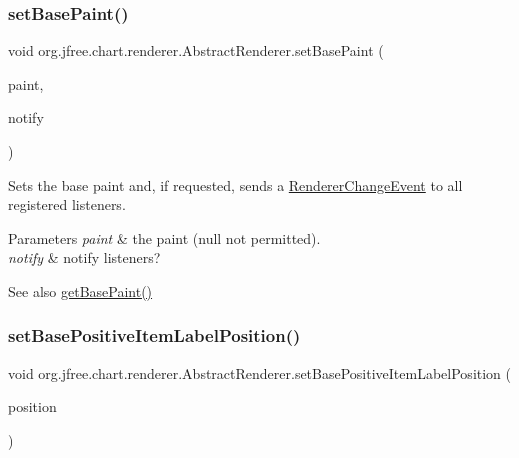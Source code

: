 \subsubsection{\texorpdfstring{set\+Base\+Paint()}{setBasePaint()}\hspace{0.1cm}{\footnotesize\ttfamily [2/2]}}
{\footnotesize\ttfamily void org.\+jfree.\+chart.\+renderer.\+Abstract\+Renderer.\+set\+Base\+Paint (\begin{DoxyParamCaption}\item[{Paint}]{paint,  }\item[{boolean}]{notify }\end{DoxyParamCaption})}

Sets the base paint and, if requested, sends a \mbox{\hyperlink{}{Renderer\+Change\+Event}} to all registered listeners.


\begin{DoxyParams}{Parameters}
{\em paint} & the paint ({\ttfamily null} not permitted). \\
\hline
{\em notify} & notify listeners?\\
\hline
\end{DoxyParams}
\begin{DoxySeeAlso}{See also}
\mbox{\hyperlink{classorg_1_1jfree_1_1chart_1_1renderer_1_1_abstract_renderer_a856d21345f9547c9ea9666db2c4928a2}{get\+Base\+Paint()}} 
\end{DoxySeeAlso}
\mbox{\label{classorg_1_1jfree_1_1chart_1_1renderer_1_1_abstract_renderer_aef3b9adf36f2b4e30112230e960ec5d7}} 
\subsubsection{\texorpdfstring{set\+Base\+Positive\+Item\+Label\+Position()}{setBasePositiveItemLabelPosition()}\hspace{0.1cm}{\footnotesize\ttfamily [1/2]}}
{\footnotesize\ttfamily void org.\+jfree.\+chart.\+renderer.\+Abstract\+Renderer.\+set\+Base\+Positive\+Item\+Label\+Position (\begin{DoxyParamCaption}\item[{\mbox{\hyperlink{classorg_1_1jfree_1_1chart_1_1labels_1_1_item_label_position}{Item\+Label\+Position}}}]{position }\end{DoxyParamCaption})}

